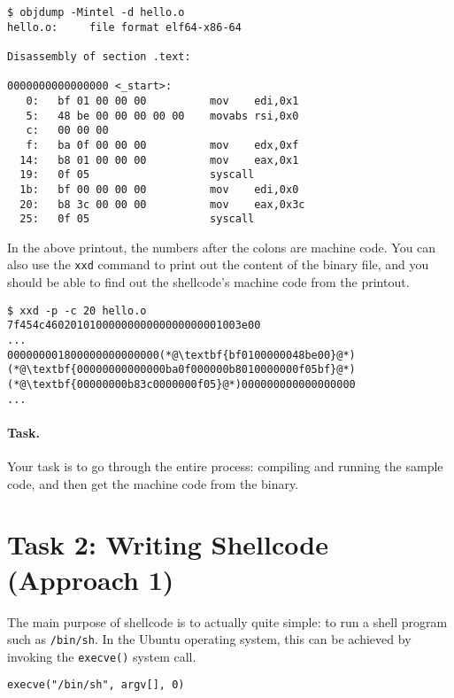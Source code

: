 \begin{lstlisting}
$ objdump -Mintel -d hello.o
hello.o:     file format elf64-x86-64

Disassembly of section .text:

0000000000000000 <_start>:
   0:	bf 01 00 00 00       	mov    edi,0x1
   5:	48 be 00 00 00 00 00 	movabs rsi,0x0
   c:	00 00 00 
   f:	ba 0f 00 00 00       	mov    edx,0xf
  14:	b8 01 00 00 00       	mov    eax,0x1
  19:	0f 05                	syscall 
  1b:	bf 00 00 00 00       	mov    edi,0x0
  20:	b8 3c 00 00 00       	mov    eax,0x3c
  25:	0f 05                	syscall 
\end{lstlisting}
 
In the above printout, the numbers after the colons
are machine code. 
You can also use the \texttt{xxd} command to print out 
the content of the binary file, and you should be 
able to find out the shellcode's machine
code from the printout.

\begin{lstlisting}
$ xxd -p -c 20 hello.o
7f454c4602010100000000000000000001003e00
...
000000001800000000000000(*@\textbf{bf0100000048be00}@*)
(*@\textbf{00000000000000ba0f000000b8010000000f05bf}@*)
(*@\textbf{00000000b83c0000000f05}@*)000000000000000000
...
\end{lstlisting}
 


\paragraph{Task.} Your task is to go through the entire process:
compiling and running the sample code, and then get the 
machine code from the binary. 



\section{Task 2: Writing Shellcode (Approach 1)} 

The main purpose of shellcode is to actually quite simple:
to run a shell program such as \texttt{/bin/sh}.
In the Ubuntu operating system, this can be achieved 
by invoking the \texttt{execve()} system call.

\begin{lstlisting}
execve("/bin/sh", argv[], 0)
\end{lstlisting}


